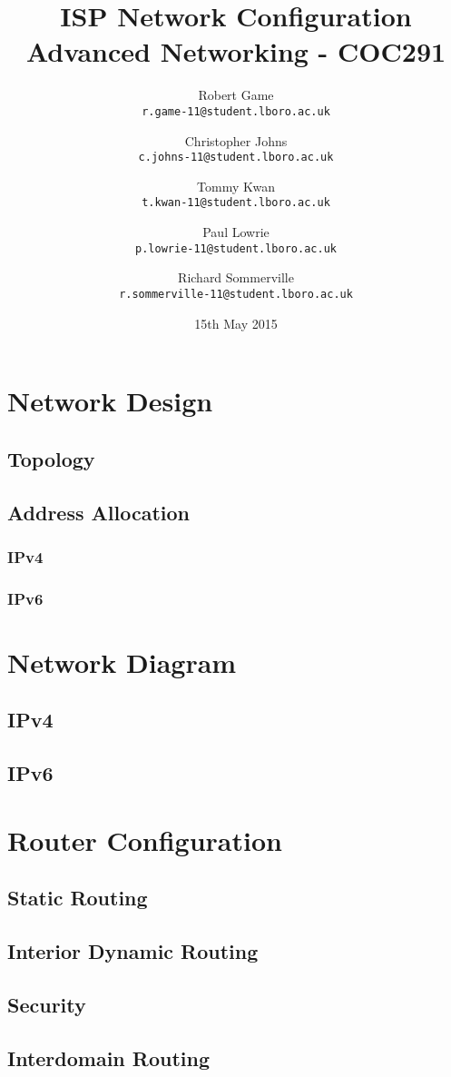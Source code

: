 \documentclass{report}
\author{
    Robert Game\\
    \texttt{r.game-11@student.lboro.ac.uk}
    \and
    Christopher Johns\\
    \texttt{c.johns-11@student.lboro.ac.uk}
    \and
    Tommy Kwan\\
    \texttt{t.kwan-11@student.lboro.ac.uk}  
    \and
    Paul Lowrie\\
    \texttt{p.lowrie-11@student.lboro.ac.uk}
    \and
    Richard Sommerville\\
    \texttt{r.sommerville-11@student.lboro.ac.uk}
}
\title{ISP Network Configuration\\ \large Advanced Networking - COC291}
\date{15th May 2015}
\begin{document}

\maketitle

\tableofcontents

\chapter{Network Design}
\section{Topology}
\section{Address Allocation}
\subsection{IPv4}
\subsection{IPv6}

\chapter{Network Diagram}
\section{IPv4}
\section{IPv6}

\chapter{Router Configuration}
\section{Static Routing}
\section{Interior Dynamic Routing}
\section{Security}
\section{Interdomain Routing}
\end{document}
